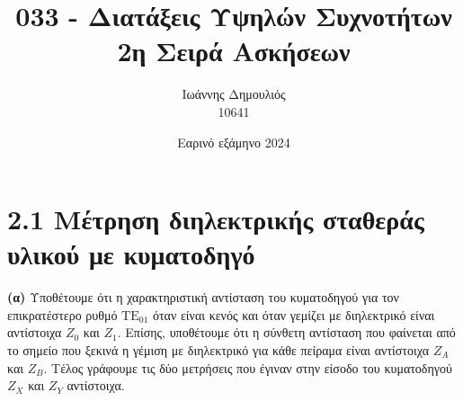 \documentclass[12pt]{article}
\title{\vspace{-2cm}033 - Διατάξεις Υψηλών Συχνοτήτων \\ 
        \large 2η Σειρά Ασκήσεων}
\author{Ιωάννης Δημουλιός \\ 
        \large 10641}
\date{Εαρινό εξάμηνο 2024}
\begin{document}
\maketitle

\section*{2.1 Μέτρηση διηλεκτρικής σταθεράς υλικού με κυματοδηγό} 
\textbf{(α)} Υποθέτουμε ότι η χαρακτηριστική αντίσταση του κυματοδηγού για τον επικρατέστερο ρυθμό \(\text{ΤΕ}_{01}\) όταν είναι κενός και όταν γεμίζει με διηλεκτρικό είναι αντίστοιχα \(Z_0 \) και \(Z_1\). Επίσης, υποθέτουμε ότι η σύνθετη αντίσταση που φαίνεται από το σημείο που ξεκινά η γέμιση με διηλεκτρικό για κάθε πείραμα είναι αντίστοιχα \(Z_A \) και \(Z_B\). Τέλος γράφουμε τις δύο μετρήσεις που έγιναν στην είσοδο του κυματοδηγού \(Z_X\) και \(Z_Y\) αντίστοιχα. 
\end{document}
